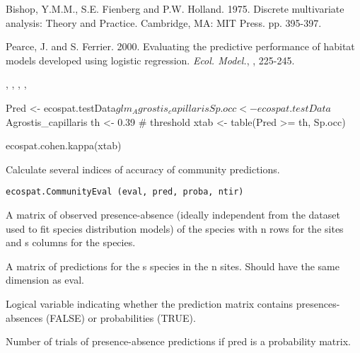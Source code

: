\documentclass[a4paper]{book}
\begin{document}
%
\begin{References}\relax
Bishop, Y.M.M., S.E. Fienberg and P.W. Holland. 1975. Discrete multivariate analysis: Theory and Practice. Cambridge, MA: MIT Press. pp. 395-397.

Pearce, J. and S. Ferrier. 2000. Evaluating the predictive performance of habitat models developed using logistic regression. \emph{Ecol. Model.}, , 225-245.
\end{References}
%
\begin{SeeAlso}\relax
{}, , , , 
\end{SeeAlso}
%
\begin{Examples}
\begin{ExampleCode}
Pred <- ecospat.testData$glm_Agrostis_capillaris
Sp.occ <- ecospat.testData$Agrostis_capillaris
th <- 0.39 # threshold
xtab <- table(Pred >= th, Sp.occ)

ecospat.cohen.kappa(xtab)
\end{ExampleCode}
\end{Examples}
%
\begin{Description}\relax
Calculate several indices of accuracy of community predictions.
\end{Description}
%
\begin{Usage}
\begin{verbatim}
ecospat.CommunityEval (eval, pred, proba, ntir)
\end{verbatim}
\end{Usage}
%
\begin{Arguments}
\begin{ldescription}
\item[\code{eval}] A matrix of observed presence-absence (ideally independent from the dataset used to fit species distribution models) of the species with n rows for the sites and s columns for the species.
\item[\code{pred}] A matrix of predictions for the s species in the n sites. Should have the same dimension as eval.
\item[\code{proba}] Logical variable indicating whether the prediction matrix contains presences-absences (FALSE) or probabilities (TRUE).
\item[\code{ntir}] Number of trials of presence-absence predictions if pred is a probability matrix.
\end{ldescription}
\end{Arguments}
\end{document}
